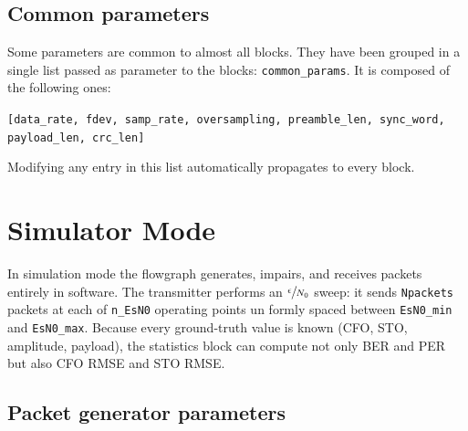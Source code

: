 \subsection{Common parameters}
Some parameters are common to almost all blocks. They have been grouped in a single list passed as parameter to the blocks: \texttt{common\_params}. It is composed of the following ones:
\begin{center}
\texttt{[data\_rate, fdev, samp\_rate, oversampling, preamble\_len,
sync\_word, payload\_len, crc\_len]}
\end{center}
Modifying any entry in this list automatically propagates to every block.



\section{Simulator Mode}
\label{sec:simulation}


In simulation mode the flowgraph generates, impairs, and receives packets entirely in software. The transmitter performs an $\sfrac{\epsilon}{N_0}$ sweep: it sends \texttt{Npackets} packets at each of \texttt{n\_EsN0} operating points un formly spaced between \texttt{EsN0\_min} and \texttt{EsN0\_max}. Because every ground-truth value is known (CFO, STO, amplitude, payload), the statistics block can compute not only BER and PER but also CFO RMSE and STO RMSE.

\subsection*{Packet generator parameters}


